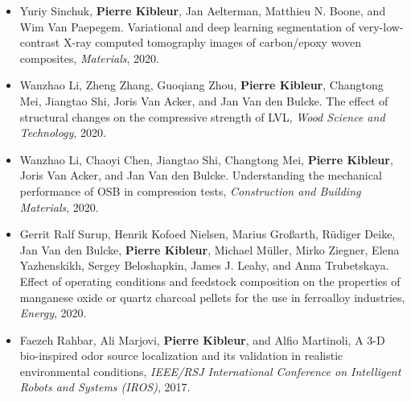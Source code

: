 \documentclass[oneside, english, 10pt, a4paper]{memoir}
\begin{document}
\begin{itemize}
	\item {Yuriy Sinchuk, \textbf{Pierre Kibleur}, Jan Aelterman, Matthieu N. Boone, and Wim Van Paepegem}. {Variational and deep learning segmentation of very-low-contrast X-ray computed tomography images of carbon/epoxy woven composites}, \emph{Materials}, 2020.   
	
	\item {Wanzhao Li, Zheng Zhang, Guoqiang Zhou, \textbf{Pierre Kibleur}, Changtong Mei, Jiangtao Shi, Joris Van Acker, and Jan Van den Bulcke}. {The effect of structural changes on the compressive strength of LVL}, \emph{Wood Science and Technology}, 2020.     

	\item  {Wanzhao Li, Chaoyi Chen, Jiangtao Shi, Changtong Mei, \textbf{Pierre Kibleur}, Joris Van Acker, and Jan Van den Bulcke}. {Understanding the mechanical performance of OSB in compression tests}, \emph{Construction and Building Materials}, 2020.
	
	\item {Gerrit Ralf Surup, Henrik Kofoed Nielsen, Marius Gro{\ss}arth, R{\"{u}}diger Deike, Jan Van den Bulcke, \textbf{Pierre Kibleur}, Michael M{\"{u}}ller, Mirko Ziegner, Elena Yazhenskikh, Sergey Beloshapkin, James J. Leahy, and Anna Trubetskaya}. {Effect of operating conditions and feedstock composition on the properties of manganese oxide or quartz charcoal pellets for the use in ferroalloy industries}, \emph{Energy}, 2020.
	
	\item {Faezeh Rahbar, Ali Marjovi, \textbf{Pierre Kibleur}, and Alfio Martinoli, A 3-D bio-inspired odor source localization and its validation in realistic environmental conditions, \emph{IEEE/RSJ International Conference on Intelligent Robots and Systems (IROS)}, 2017.}
\end{itemize}
       
\end{document}
